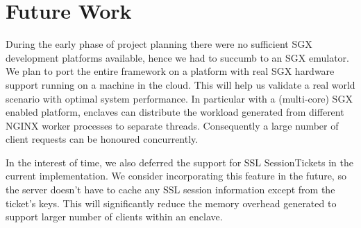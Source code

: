 \documentclass[../main.tex]{subfiles}
\begin{document}
\section{Future Work}
During the early phase of project planning there were no sufficient SGX
development platforms available, hence we had to succumb to an SGX emulator. We
plan to port the entire framework on a platform with real SGX hardware support
running on a machine in the cloud. This will help us validate a real world
scenario with optimal system performance. In particular with a (multi-core) SGX
enabled platform, enclaves can distribute the workload generated from different
NGINX worker processes to separate threads. Consequently a large number of
client requests can be honoured concurrently.

In the interest of time, we also deferred the support for SSL SessionTickets in
the current implementation. We consider incorporating this feature in the
future, so the server doesn't have to cache any SSL session information except
from the ticket's keys. This will significantly reduce the memory overhead
generated to support larger number of clients within an enclave.
\end{document}
